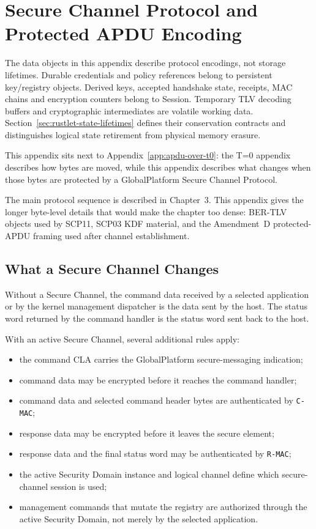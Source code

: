 \chapter{Secure Channel Protocol and Protected APDU Encoding}
\label{app:scp-data-objects}


The data objects in this appendix describe protocol encodings, not storage
lifetimes. Durable credentials and policy references belong to persistent
key/registry objects. Derived keys, accepted handshake state, receipts, MAC
chains and encryption counters belong to Session. Temporary TLV decoding
buffers and cryptographic intermediates are volatile working data.
Section~\ref{sec:rustlet-state-lifetimes} defines their conservation contracts
and distinguishes logical state retirement from physical memory erasure.

This appendix sits next to Appendix~\ref{app:apdu-over-t0}: the T=0 appendix
describes how bytes are moved, while this appendix describes what changes when
those bytes are protected by a GlobalPlatform Secure Channel Protocol.

The main protocol sequence is described in Chapter~3. This appendix gives the
longer byte-level details that would make the chapter too dense: BER-TLV
objects used by SCP11, SCP03 KDF material, and the Amendment~D protected-APDU
framing used after channel establishment.

\section{What a Secure Channel Changes}

Without a Secure Channel, the command data received by a selected application
or by the kernel management dispatcher is the data sent by the host. The status
word returned by the command handler is the status word sent back to the host.

With an active Secure Channel, several additional rules apply:
\begin{itemize}
\item the command CLA carries the GlobalPlatform secure-messaging indication;
\item command data may be encrypted before it reaches the command handler;
\item command data and selected command header bytes are authenticated by
      \texttt{C-MAC};
\item response data may be encrypted before it leaves the secure element;
\item response data and the final status word may be authenticated by
      \texttt{R-MAC};
\item the active Security Domain instance and logical channel define which
      secure-channel session is used;
\item management commands that mutate the registry are authorized through the
      active Security Domain, not merely by the selected application.
\end{itemize}


